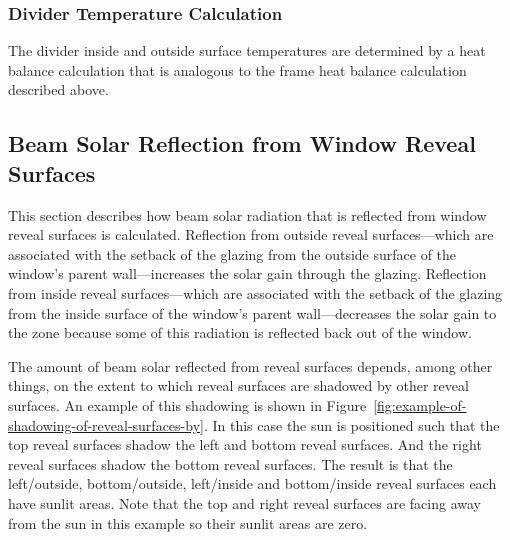\subsubsection{Divider Temperature Calculation}\label{divider-temperature-calculation}

The divider inside and outside surface temperatures are determined by a heat balance calculation that is analogous to the frame heat balance calculation described above.

\subsection{Beam Solar Reflection from Window Reveal Surfaces}\label{beam-solar-reflection-from-window-reveal-surfaces}

This section describes how beam solar radiation that is reflected from window reveal surfaces is calculated. Reflection from outside reveal surfaces---which are associated with the setback of the glazing from the outside surface of the window's parent wall---increases the solar gain through the glazing. Reflection from inside reveal surfaces---which are associated with the setback of the glazing from the inside surface of the window's parent wall---decreases the solar gain to the zone because some of this radiation is reflected back out of the window.

The amount of beam solar reflected from reveal surfaces depends, among other things, on the extent to which reveal surfaces are shadowed by other reveal surfaces. An example of this shadowing is shown in Figure~\ref{fig:example-of-shadowing-of-reveal-surfaces-by}. In this case the sun is positioned such that the top reveal surfaces shadow the left and bottom reveal surfaces. And the right reveal surfaces shadow the bottom reveal surfaces. The result is that the left/outside, bottom/outside, left/inside and bottom/inside reveal surfaces each have sunlit areas. Note that the top and right reveal surfaces are facing away from the sun in this example so their sunlit areas are zero.

